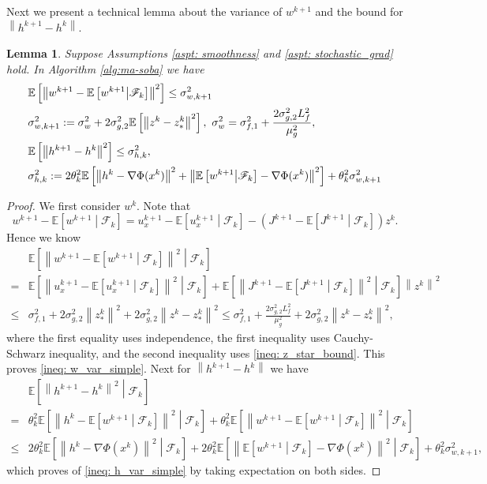 \documentclass[10pt]{article}
\newtheorem{lemma}{Lemma}[section]
\theoremstyle{remark}
\def\setF{\mathscr{F}} %
\newcommand{\E}{\mathbb{E}}
\newcommand{\norm}[1]{\left\|#1\right\|}
\begin{document}
Next we present a technical lemma about the variance of $w^{k+1}$ and the bound for $\norm{h^{k+1} - h^k}$.
\begin{lemma}\label{lem: variance_simple}
    Suppose Assumptions \ref{aspt: smoothness} and \ref{aspt: stochastic_grad} hold. In Algorithm \ref{alg:ma-soba} we have
    \begin{align}
        &\E\left[\norm{w^{k+1} - \E\left[w^{k+1}\middle|\setF_k\right]}^2\right] \leq \sigma_{w,k+1}^2 \notag\\
        &\sigma_{w,k+1}^2 := \sigma_{w}^2 + 2\sigma_{g,2}^2\E\left[\norm{z^k - z_*^k}^2\right],\ \sigma_w^2 = \sigma_{f,1}^2 + \frac{2\sigma_{g,2}^2L_f^2}{\mu_g^2}, \label{ineq: w_var_simple}\\
        &\E\left[\norm{h^{k+1} - h^k}^2\right]\leq \sigma_{h, k}^2,\notag \\
        &\sigma_{h, k}^2 := 2\theta_k^2\E\left[\norm{h^k - \nabla\Phi(x^k)}^2 + \norm{\E\left[w^{k+1}\middle|\setF_k\right] -\nabla\Phi(x^k)}^2\right]+\theta_k^2\sigma_{w,k+1}^2 \label{ineq: h_var_simple}
    \end{align}
\end{lemma}
\begin{proof}
We first consider $w^k$. Note that
\[
    w^{k+1} - \E\left[w^{k+1}\middle|\setF_k\right] = u_x^{k+1} - \E\left[u_x^{k+1}\middle|\setF_k\right] - \left(J^{k+1} - \E\left[J^{k+1}\middle|\setF_k\right]\right)z^k.
\]
Hence we know 
\begin{align*}
    &\E\left[\norm{w^{k+1} - \E\left[w^{k+1}\middle|\setF_k\right]}^2\middle|\setF_k\right] \\
        = &\E\left[\norm{u_x^{k+1} - \E\left[u_x^{k+1}\middle|\setF_k\right]}^2\middle|\setF_k\right] + 
        \E\left[\norm{J^{k+1} - \E\left[J^{k+1}\middle|\setF_k\right]}^2\middle|\setF_k\right]\norm{z^k}^2\\
        \leq &\sigma_{f,1}^2 + 2\sigma_{g,2}^2\norm{z_*^k}^2 + 2\sigma_{g,2}^2\norm{z^k - z_*^k}^2 \leq \sigma_{f,1}^2 + \frac{2\sigma_{g,2}^2L_f^2}{\mu_g^2} + 2\sigma_{g,2}^2\norm{z^k - z_*^k}^2,
\end{align*}
where the first equality uses independence, the first inequality uses Cauchy-Schwarz inequality, and the second inequality uses \eqref{ineq: z_star_bound}. This proves \eqref{ineq: w_var_simple}. Next for $\norm{h^{k+1} - h^k}$ we have
\begin{align*}
    &\E\left[\norm{h^{k+1} - h^k}^2\middle|\setF_k\right] \\
    = &\theta_k^2\E\left[\norm{h^k - \E\left[w^{k+1}\middle|\setF_k\right]}^2\middle|\setF_k\right] + \theta_k^2\E\left[\norm{w^{k+1} - \E\left[w^{k+1}\middle|\setF_k\right] }^2\middle|\setF_k\right] \\
    \leq &2\theta_k^2\E\left[\norm{h^k - \nabla\Phi(x^k)}^2\middle|\setF_k\right] + 2\theta_k^2\E\left[\norm{\E\left[w^{k+1}\middle|\setF_k\right] -\nabla\Phi(x^k) }^2 \middle|\setF_k\right] + \theta_k^2\sigma_{w,k+1}^2,
\end{align*}
which proves of \eqref{ineq: h_var_simple} by taking expectation on both sides.
\end{proof}
\end{document}
